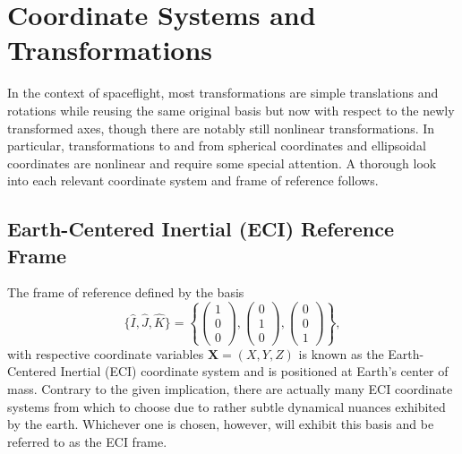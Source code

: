 \documentclass[11pt,dvipsnames]{thesis}
\begin{document}
\chapter{Coordinate Systems and Transformations}
In the context of spaceflight, most transformations are simple translations and rotations while reusing the same original basis but now with respect to the newly transformed axes, though there are notably still nonlinear transformations. In particular, transformations to and from spherical coordinates and ellipsoidal coordinates are nonlinear and require some special attention. A thorough look into each relevant coordinate system and frame of reference follows.

\section{Earth-Centered Inertial (ECI) Reference Frame}
The frame of reference defined by the basis
\begin{equation}
\{\hat{I}, \hat{J}, \hat{K}\} = \left\{\begin{pmatrix}1 \\ 0 \\ 0\end{pmatrix}, \begin{pmatrix}0 \\ 1 \\ 0\end{pmatrix}, \begin{pmatrix}0 \\ 0 \\ 1\end{pmatrix}\right\}, \label{eq:ECIbasis}
\end{equation}
with respective coordinate variables $\mathbf{X} = (X, Y, Z)$ is known as the Earth-Centered Inertial (ECI) coordinate system and is positioned at Earth's center of mass. Contrary to the given implication, there are actually many ECI coordinate systems from which to choose due to rather subtle dynamical nuances exhibited by the earth. Whichever one is chosen, however, will exhibit this basis and be referred to as the ECI frame.
\end{document}
